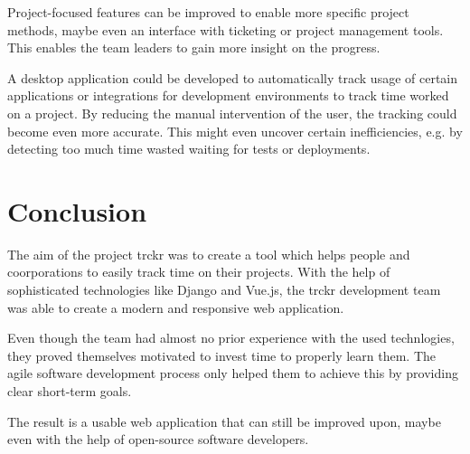 \documentclass[bibliography=totoc, listof=totocnumbered]{scrartcl}
\begin{document}
Project-focused features can be improved to enable more specific project
methods, maybe even an interface with ticketing or project management tools.
This enables the team leaders to gain more insight on the progress.

A desktop application could be developed to automatically track usage of certain
applications or integrations for development environments to track time worked
on a project. By reducing the manual intervention of the user, the tracking
could become even more accurate. This might even uncover certain inefficiencies,
e.g. by detecting too much time wasted waiting for tests or deployments.

\section{Conclusion}
The aim of the project trckr was to create a tool which helps people and
coorporations to easily track time on their projects. With the help of
sophisticated technologies like Django and Vue.js, the trckr development
team was able to create a modern and responsive web application.

Even though the team had almost no prior experience with the used technlogies,
they proved themselves motivated to invest time to properly learn them. The
agile software development process only helped them to achieve this by providing
clear short-term goals.

The result is a usable web application that can still be improved upon, maybe
even with the help of open-source software developers.

\clearpage
\printbibliography
\end{document}
